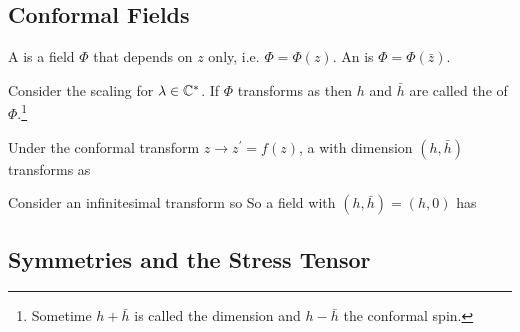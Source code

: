 \documentclass{article}
\begin{document}
\subsection{Conformal Fields}

\begin{definition}
A  is a field $\Phi$ that depends on $z$ only, i.e. $\Phi=\Phi(z)$. An  is $\Phi = \Phi(\bar{z})$. 
\end{definition}

\begin{definition}
Consider the scaling
for $\lambda \in \mathbb{C}^\ast $. If $\Phi$ transforms as 
then $h$ and $\bar{h}$ are called the  of $\Phi$.\footnote{Sometime $h+\bar{h}$ is called the dimension and $h-\bar{h}$ the conformal spin.}
\end{definition}

\begin{definition}
Under the conformal transform $z \to z^\prime = f(z)$, a  with dimension $(h,\bar{h})$ transforms as 
\end{definition}

\begin{example}
Consider an infinitesimal transform 
so 
So a field with $(h,\bar{h}) = (h,0)$ has 
\end{example}

\subsection{Symmetries and the Stress Tensor}
\end{document}

